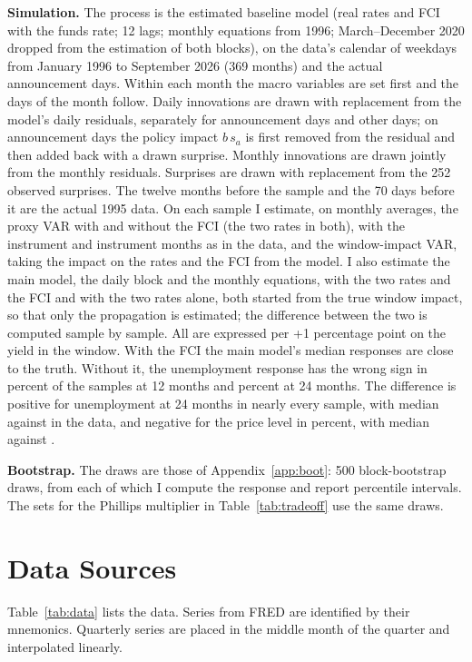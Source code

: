 \documentclass[11pt]{article}
\begin{document}
\begin{appendices}
\textbf{Simulation.} The process is the estimated baseline model (real rates and FCI with the funds rate; 12 lags; monthly equations from 1996; March--December 2020 dropped from the estimation of both blocks), on the data's calendar of weekdays from January 1996 to September 2026 (369 months) and the actual announcement days. Within each month the macro variables are set first and the days of the month follow. Daily innovations are drawn with replacement from the model's daily residuals, separately for announcement days and other days; on announcement days the policy impact $b\,s_a$ is first removed from the residual and then added back with a drawn surprise. Monthly innovations are drawn jointly from the monthly residuals. Surprises are drawn with replacement from the 252 observed surprises. The twelve months before the sample and the 70 days before it are the actual 1995 data. On each sample I estimate, on monthly averages, the proxy VAR with and without the FCI (the two rates in both), with the instrument and instrument months as in the data, and the window-impact VAR, taking the impact on the rates and the FCI from the model. I also estimate the main model, the daily block and the monthly equations, with the two rates and the FCI and with the two rates alone, both started from the true window impact, so that only the propagation is estimated; the difference between the two is computed sample by sample. All are expressed per +1 percentage point on the yield in the window. With the FCI the main model's median responses are close to the truth. Without it, the unemployment response has the wrong sign in  percent of the samples at 12 months and  percent at 24 months. The difference is positive for unemployment at 24 months in nearly every sample, with median  against  in the data, and negative for the price level in  percent, with median  against .

\textbf{Bootstrap.} The draws are those of Appendix~\ref{app:boot}: 500 block-bootstrap draws, from each of which I compute the response and report percentile intervals. The sets for the Phillips multiplier in Table~\ref{tab:tradeoff} use the same draws.

\FloatBarrier
\section{Data Sources}\label{app:data}
Table~\ref{tab:data} lists the data. Series from FRED are identified by their mnemonics. Quarterly series are placed in the middle month of the quarter and interpolated linearly.


\end{appendices}
\end{document}
